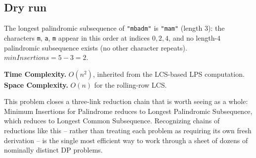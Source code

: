 \subsection*{Dry run}


The longest palindromic subsequence of \texttt{"mbadm"} is
\texttt{"mam"} (length $3$): the characters \texttt{m}, \texttt{a},
\texttt{m} appear in this order at indices $0,2,4$, and no length-$4$
palindromic subsequence exists (no other character repeats).
$\textit{minInsertions} = 5-3=2$.

\begin{complexitybox}
\textbf{Time Complexity.} $O(n^2)$, inherited from the LCS-based LPS
computation.
\textbf{Space Complexity.} $O(n)$ for the rolling-row LCS.
\end{complexitybox}

\begin{takeawaybox}
This problem closes a three-link reduction chain that is worth seeing
as a whole: Minimum Insertions for Palindrome reduces to Longest
Palindromic Subsequence, which reduces to Longest Common Subsequence.
Recognizing chains of reductions like this -- rather than treating each
problem as requiring its own fresh derivation -- is the single most
efficient way to work through a sheet of dozens of nominally distinct DP
problems.
\end{takeawaybox}
